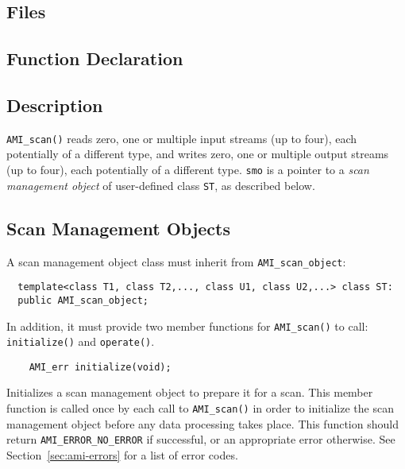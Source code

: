         
        

\subsection{Files}
  \btabb
     {}
  \etabb

\subsection{Function Declaration}
\btabb {} {} \etabb

\subsection{Description}

\lstinline|AMI_scan()| reads zero, one or multiple input streams (up
to four), each potentially of a different type, and writes zero, one
or multiple output streams (up to four), each potentially of a
different type.  \lstinline|smo| is a pointer to a {\em scan
  management object} of user-defined class \lstinline|ST|, as
described below.

\subsection{Scan Management Objects}


A scan management object class must inherit from
\lstinline|AMI_scan_object|:
\begin{lstlisting}
  template<class T1, class T2,..., class U1, class U2,...> class ST:
  public AMI_scan_object;
\end{lstlisting}
In addition, it must provide two member functions for
\lstinline|AMI_scan()| to call: \lstinline|initialize()| and
\lstinline|operate()|.  
\begin{lstlisting}
    AMI_err initialize(void);
\end{lstlisting}
    Initializes a scan management object to prepare
    it for a scan.  This member function is called once by
    each call to \lstinline|AMI_scan()| in order to initialize
    the scan management object before any data processing
    takes place.  This function should return
    \lstinline|AMI_ERROR_NO_ERROR| if successful, or an
    appropriate error otherwise. See
    Section~\ref{sec:ami-errors} for a list of error codes.
    
